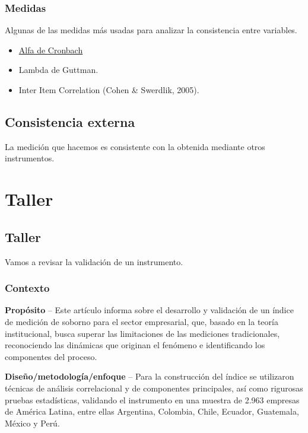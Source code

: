 \documentclass[
  letterpaper,
  DIV=11,
  numbers=noendperiod]{scrreprt}
\begin{document}
\subsection{Medidas}\label{medidas}

Algunas de las medidas más usadas para analizar la consistencia entre
variables.

\begin{itemize}
\item
  \href{https://doi.org/10.1007/BF02310555}{Alfa de Cronbach}
\item
  Lambda de Guttman.
\item
  Inter Item Correlation (Cohen \& Swerdlik, 2005).
\end{itemize}

\section{Consistencia externa}\label{consistencia-externa}

La medición que hacemos es consistente con la obtenida mediante otros
instrumentos.


\chapter{Taller}\label{taller}

\section{Taller}\label{taller-1}

Vamos a revisar la validación de un instrumento.

\subsection{Contexto}\label{contexto}

\textbf{Propósito} -- Este artículo informa sobre el desarrollo y
validación de un índice de medición de soborno para el sector
empresarial, que, basado en la teoría institucional, busca superar las
limitaciones de las mediciones tradicionales, reconociendo las dinámicas
que originan el fenómeno e identificando los componentes del proceso.

\textbf{Diseño/metodología/enfoque} -- Para la construcción del índice
se utilizaron técnicas de análisis correlacional y de componentes
principales, así como rigurosas pruebas estadísticas, validando el
instrumento en una muestra de 2.963 empresas de América Latina, entre
ellas Argentina, Colombia, Chile, Ecuador, Guatemala, México y Perú.
\end{document}
